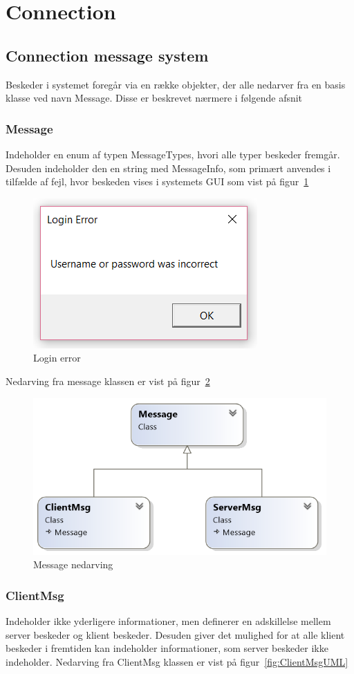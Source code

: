 \section{Connection}

\subsection{Connection message system}

Beskeder i systemet foregår via en række objekter, der alle nedarver fra en basis klasse ved navn Message. Disse er beskrevet nærmere i følgende afsnit

\subsubsection{Message}
Indeholder en enum af typen MessageTypes, hvori alle typer beskeder fremgår. Desuden indeholder den en string med MessageInfo, som primært anvendes i tilfælde af fejl, hvor beskeden vises i systemets GUI som vist på figur~\ref{fig:loginError}

\begin{figure}
	\centering
	\includegraphics[width=0.3\linewidth]{figs/connection/loginError.png}
	\caption{Login error}
	\label{fig:loginError}
\end{figure}

Nedarving fra message klassen er vist på figur~\ref{fig:MessageUML}

\begin{figure}
	\centering
	\includegraphics[width=0.6\linewidth]{figs/connection/MessageUML.png}
	\caption{Message nedarving}
	\label{fig:MessageUML}
\end{figure}

\subsubsection{ClientMsg}
Indeholder ikke yderligere informationer, men definerer en adskillelse mellem server beskeder og klient beskeder. Desuden giver det mulighed for at alle klient beskeder i fremtiden kan indeholder informationer, som server beskeder ikke indeholder. Nedarving fra ClientMsg klassen er vist på figur~\ref{fig:ClientMsgUML}

